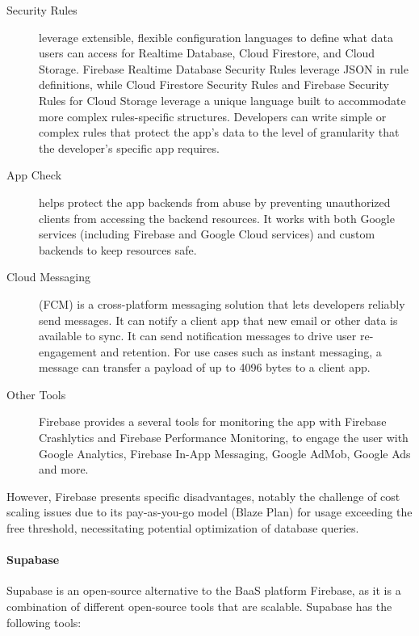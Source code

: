 \begin{description}
    \item[Security Rules] leverage extensible, flexible configuration languages to define what data users can access for Realtime Database, Cloud Firestore, and Cloud Storage. Firebase Realtime Database Security Rules leverage JSON in rule definitions, while Cloud Firestore Security Rules and Firebase Security Rules for Cloud Storage leverage a unique language built to accommodate more complex rules-specific structures. Developers can write simple or complex rules that protect the app's data to the level of granularity that the developer's specific app requires.\cite{firebaseRules}
    \item[App Check] helps protect the app backends from abuse by preventing unauthorized clients from accessing the backend resources. It works with both Google services (including Firebase and Google Cloud services) and custom backends to keep resources safe.\cite{firebaseAppCheck}
    \item[Cloud Messaging] (FCM) is a cross-platform messaging solution that lets developers reliably send messages. It can notify a client app that new email or other data is available to sync. It can send notification messages to drive user re-engagement and retention. For use cases such as instant messaging, a message can transfer a payload of up to 4096 bytes to a client app.\cite{firebaseMsg}
    \item[Other Tools] Firebase provides a several tools for monitoring the app with Firebase Crashlytics and Firebase Performance Monitoring, to engage the user with Google Analytics, Firebase In-App Messaging, Google AdMob, Google Ads and more.\cite{firebaseOverview}
\end{description}


However, Firebase presents specific disadvantages, notably the challenge of cost scaling issues due to its pay-as-you-go model (Blaze Plan) for usage exceeding the free threshold, necessitating potential optimization of database queries\cite{ZewdieAyezabu2022, denys}.

\paragraph{Supabase}

Supabase\cite{supabase} is an open-source alternative to the BaaS platform Firebase, as it is a combination of different open-source tools that are scalable\cite{ZewdieAyezabu2022}.
Supabase has the following tools:

